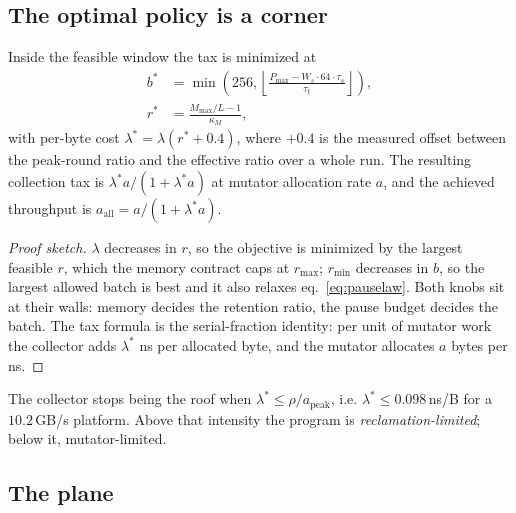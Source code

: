 \subsection{The optimal policy is a corner}
\label{sec:roofline-optimal}

\begin{theorem}[Optimality]
\label{thm:optimal}
Inside the feasible window the tax is minimized at
\begin{equation}
\begin{aligned}
b^{\ast} &= \min\left(256, \left\lfloor \frac{P_{\max} - W_s\cdot 64\cdot\tau_s}{\tau_t} \right\rfloor\right),\\
r^{\ast} &= \frac{M_{\max}/L - 1}{\kappa_M},
\end{aligned}
\end{equation}
with per-byte cost $\lambda^{\ast} = \lambda(r^{\ast} + 0.4)$, where $+0.4$ is the measured offset
between the peak-round ratio and the effective ratio over a whole run.
The resulting collection tax is $\lambda^{\ast} a/(1 + \lambda^{\ast} a)$ at mutator allocation rate
$a$, and the achieved throughput is $a_{\text{all}} = a/(1 + \lambda^{\ast} a)$.
\end{theorem}
\begin{proof}[Proof sketch]
$\lambda$ decreases in $r$, so the objective is minimized by the largest feasible $r$, which the memory
contract caps at $r_{\max}$; $r_{\min}$ decreases in $b$, so the largest allowed batch is best and it
also relaxes eq.~\ref{eq:pauselaw}.
Both knobs sit at their walls: memory decides the retention ratio, the pause budget decides the batch.
The tax formula is the serial-fraction identity: per unit of mutator work the collector adds
$\lambda^{\ast}$ ns per allocated byte, and the mutator allocates $a$ bytes per ns.
\end{proof}

\begin{proposition}[Ridge]
\label{prop:ridge}
The collector stops being the roof when $\lambda^{\ast} \le \rho/a_{\text{peak}}$, i.e.
$\lambda^{\ast} \le 0.098$\,ns/B for a $10.2$\,GB/s platform.
Above that intensity the program is \emph{reclamation-limited}; below it, mutator-limited.
\end{proposition}

\subsection{The plane}
\label{sec:roofline-plane}

